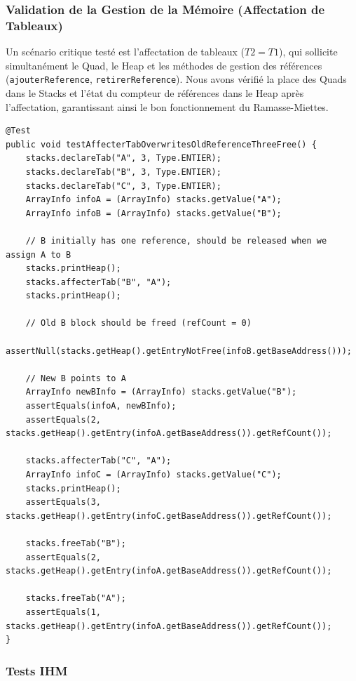 \subsubsection{Validation de la Gestion de la Mémoire (Affectation de Tableaux)}

Un scénario critique testé est l'affectation de tableaux ($T2 = T1$), qui sollicite simultanément le Quad, le Heap et les méthodes de gestion des références (\texttt{ajouterReference}, \texttt{retirerReference}). Nous avons vérifié la place des Quads dans le Stacks et l'état du compteur de références dans le Heap après l'affectation, garantissant ainsi le bon fonctionnement du Ramasse-Miettes.

\begin{verbatim}
@Test
public void testAffecterTabOverwritesOldReferenceThreeFree() {
    stacks.declareTab("A", 3, Type.ENTIER);
    stacks.declareTab("B", 3, Type.ENTIER);
    stacks.declareTab("C", 3, Type.ENTIER);
    ArrayInfo infoA = (ArrayInfo) stacks.getValue("A");
    ArrayInfo infoB = (ArrayInfo) stacks.getValue("B");

    // B initially has one reference, should be released when we assign A to B
    stacks.printHeap();
    stacks.affecterTab("B", "A");
    stacks.printHeap();

    // Old B block should be freed (refCount = 0)
    assertNull(stacks.getHeap().getEntryNotFree(infoB.getBaseAddress()));

    // New B points to A
    ArrayInfo newBInfo = (ArrayInfo) stacks.getValue("B");
    assertEquals(infoA, newBInfo);
    assertEquals(2, stacks.getHeap().getEntry(infoA.getBaseAddress()).getRefCount());

    stacks.affecterTab("C", "A");
    ArrayInfo infoC = (ArrayInfo) stacks.getValue("C");
    stacks.printHeap();
    assertEquals(3, stacks.getHeap().getEntry(infoC.getBaseAddress()).getRefCount());

    stacks.freeTab("B");
    assertEquals(2, stacks.getHeap().getEntry(infoA.getBaseAddress()).getRefCount());

    stacks.freeTab("A");
    assertEquals(1, stacks.getHeap().getEntry(infoA.getBaseAddress()).getRefCount());
}
\end{verbatim}

\subsubsection{Tests IHM}

